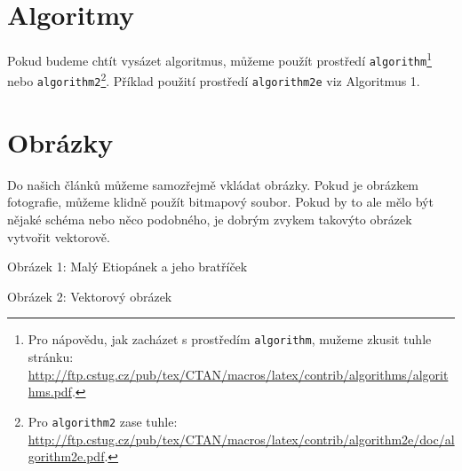 \documentclass[11pt]{article}
\begin{document}
    \section{Algoritmy}
    Pokud budeme chtít vysázet algoritmus, můžeme použít prostředí \verb|algorithm|\footnote[2]{Pro nápovědu,
        jak zacházet s prostředím \texttt{algorithm}, mužeme zkusit tuhle stránku: \href{http://ftp.cstug.cz/pub/tex/CTAN/macros/latex/contrib/algorithms/algorithms.pdf}{http://ftp.cstug.cz/pub/tex/CTAN/macros/latex/contrib/algorithms/algorithms.pdf}.} nebo \verb|algorithm2|\footnote[3]{Pro \texttt{algorithm2} zase tuhle: \href{http://ftp.cstug.cz/pub/tex/CTAN/macros/latex/contrib/algorithm2e/doc/algorithm2e.pdf}{http://ftp.cstug.cz/pub/tex/CTAN/macros/latex/contrib/algorithm2e/doc/algorithm2e.pdf}.}.
    Příklad použití prostředí \verb|algorithm2e| viz Algoritmus 1.


    \section{Obrázky}

    Do našich článků můžeme samozřejmě vkládat obrázky. Pokud je obrázkem fotografie, můžeme klidně použít bitmapový
    soubor. Pokud by to ale mělo být nějaké schéma nebo něco podobného, je dobrým zvykem takovýto obrázek vytvořit
    vektorově.\\

    \begin{center}
    \end{center}

    \begin{center}
        Obrázek 1: Malý Etiopánek a jeho bratříček
    \end{center}

    \begin{center}
    \end{center}

    \begin{center}
        Obrázek 2: Vektorový obrázek
    \end{center}



    \begin{center}
    \end{center}
\end{document}
